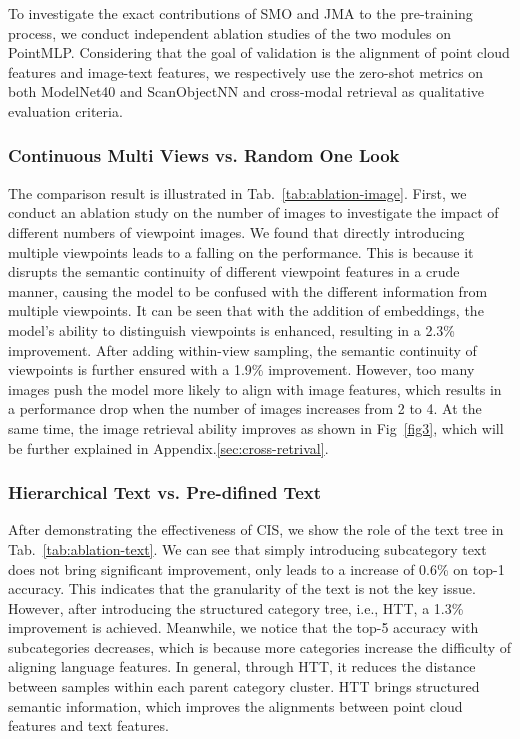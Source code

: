 \documentclass[sigconf]{acmart}
\begin{document}
To investigate the exact contributions of SMO and JMA to the pre-training process, we conduct independent ablation studies of the two modules on PointMLP. Considering that the goal of validation is the alignment of point cloud features and image-text features, we respectively use the zero-shot metrics on both ModelNet40 and ScanObjectNN and cross-modal retrieval as qualitative evaluation criteria.





\subsubsection{\textbf{Continuous Multi Views vs. Random One Look}}

The comparison result is illustrated in Tab.~\ref{tab:ablation-image}. First, we conduct an ablation study on the number of images to investigate the impact of different numbers of viewpoint images. We found that directly introducing multiple viewpoints leads to a falling on the performance. This is because it disrupts the semantic continuity of different viewpoint features in a crude manner, causing the model to be confused with the different information from multiple viewpoints. It can be seen that with the addition of embeddings, the model's ability to distinguish viewpoints is enhanced, resulting in a 2.3\% improvement. After adding within-view sampling, the semantic continuity of viewpoints is further ensured with a 1.9\% improvement. However, too many images push the model more likely to align with image features, which results in a performance drop when the number of images increases from 2 to 4. At the same time, the image retrieval ability improves as shown in Fig~\ref{fig3}, which will be further explained in Appendix.\ref{sec:cross-retrival}.



\subsubsection{\textbf{Hierarchical Text vs. Pre-difined Text}}

After demonstrating the effectiveness of CIS, we show the role of the text tree in Tab.~\ref{tab:ablation-text}. We can see that simply introducing subcategory text does not bring significant improvement, only leads to a increase of 0.6\% on top-1 accuracy. This indicates that the granularity of the text is not the key issue. However, after introducing the structured category tree, {i.e.}, HTT, a 1.3\% improvement is achieved. Meanwhile, we notice that the top-5 accuracy with subcategories decreases, which is because more categories increase the difficulty of aligning language features. In general, through HTT, it reduces the distance between samples within each parent category cluster. HTT brings structured semantic information, which improves the alignments between point cloud features and text features.
\end{document}
